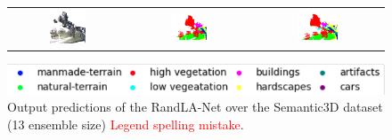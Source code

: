 \begin{figure}[h!]
\begin{tabular}{ccc}
            \includegraphics[width=0.33\textwidth, height=0.18\textheight]{images/seg_output/sem3d_seg_output/3_RGB.png} &
            \includegraphics[width=0.33\textwidth, height=0.18\textheight]{images/seg_output/sem3d_seg_output/3_GT.png}& 
            \includegraphics[width=0.33\textwidth, height=0.18\textheight]{images/seg_output/sem3d_seg_output/3_Pred.png}\\
        \end{tabular}
        \includegraphics[scale=0.65]{images/legend.png}
        \caption{Output predictions of the RandLA-Net over the Semantic3D dataset (13 ensemble size) \textcolor{red}{Legend spelling mistake}.}
        \label{fig:deepensemble_vis_sem3d}
    \end{figure}

    

